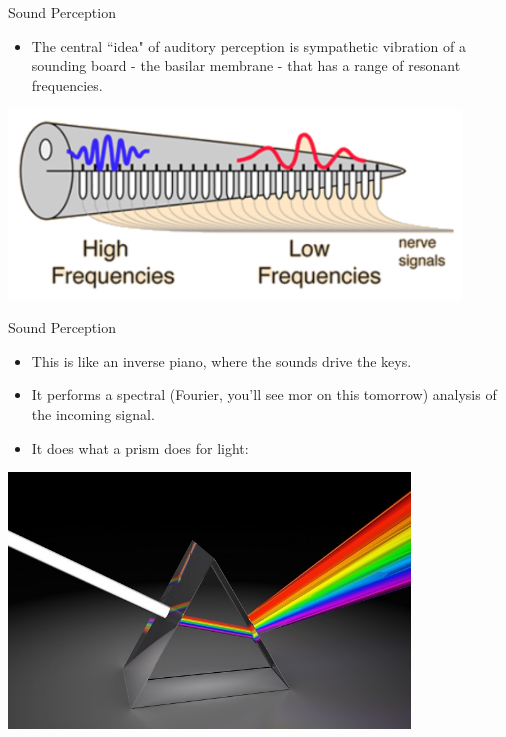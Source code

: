 \documentclass{beamer}
\begin{document}
\begin{frame}{Sound Perception}
   \begin{itemize}
      \item The central ``idea" of auditory perception is sympathetic vibration of a sounding board - the basilar membrane - that has a range of resonant frequencies.
   \end{itemize}
   \begin{center}
      \includegraphics[width=0.9\textwidth]{figures/basilar.png}
   \end{center}
\end{frame}

\begin{frame}{Sound Perception}
   \begin{itemize}
      \item This is like an inverse piano, where the sounds drive the keys.
      \item It performs a spectral (Fourier, you'll see mor on this tomorrow) analysis of the incoming signal.
      \item It does what a prism does for light:
   \end{itemize}
   \begin{center}
      \includegraphics[width=0.8\textwidth]{figures/prism.jpg}
   \end{center}
\end{frame}
\end{document}
